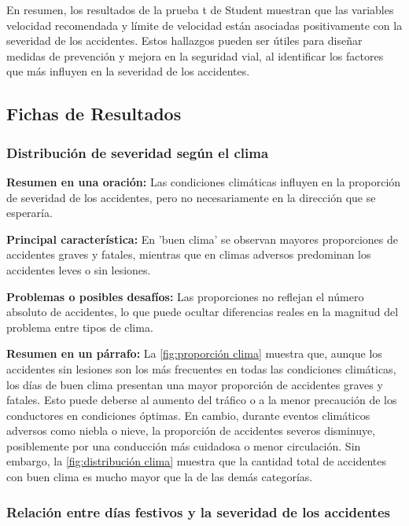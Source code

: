 \documentclass{book}
\begin{document}
En resumen, los resultados de la prueba t de Student muestran que las variables velocidad recomendada y límite de velocidad están asociadas positivamente con la severidad de los accidentes. Estos hallazgos pueden ser útiles para diseñar medidas de prevención y mejora en la seguridad vial, al identificar los factores que más influyen en la severidad de los accidentes.





\newpage
\subsection{Fichas de Resultados}

\subsubsection{Distribución de severidad según el clima}

\textbf{Resumen en una oración:} Las condiciones climáticas influyen en la proporción de severidad de los accidentes, pero no necesariamente en la dirección que se esperaría.

\textbf{Principal característica:} En 'buen clima' se observan mayores proporciones de accidentes graves y fatales, mientras que en climas adversos predominan los accidentes leves o sin lesiones.

\textbf{Problemas o posibles desafíos:} Las proporciones no reflejan el número absoluto de accidentes, lo que puede ocultar diferencias reales en la magnitud del problema entre tipos de clima.

\textbf{Resumen en un párrafo:} La \ref{fig:proporción clima} muestra que, aunque los accidentes sin lesiones son los más frecuentes en todas las condiciones climáticas, los días de buen clima presentan una mayor proporción de accidentes graves y fatales. Esto puede deberse al aumento del tráfico o a la menor precaución de los conductores en condiciones óptimas. En cambio, durante eventos climáticos adversos como niebla o nieve, la proporción de accidentes severos disminuye, posiblemente por una conducción más cuidadosa o menor circulación. Sin embargo, la \ref{fig:distribución clima} muestra que la cantidad total de accidentes con buen clima es mucho mayor que la de las demás categorías.


\subsubsection{Relación entre días festivos y la severidad de los accidentes}
\end{document}
